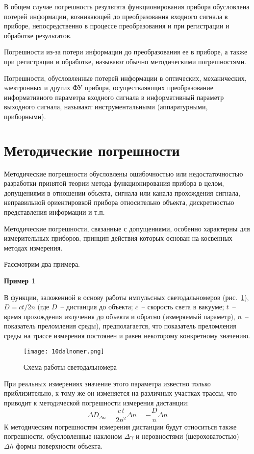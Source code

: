 В общем случае погрешность результата функционирования прибора обусловлена потерей информации, возникающей до преобразования входного сигнала в приборе, непосредственно в процессе преобразования и при регистрации и обработке результатов. 

Погрешности из-за потери информации до преобразования ее в приборе, а также при регистрации и обработке, называют обычно методическими погрешностями.

Погрешности, обусловленные потерей информации в оптических, механических, электронных и других ФУ прибора, осуществляющих преобразование информативного параметра входного сигнала в информативный параметр выходного сигнала, называют инструментальными (аппаратурными, приборными).

\section{Методические погрешности}

Методические погрешности обусловлены ошибочностью или недостаточностью разработки принятой теории метода функционирования прибора в целом, допущениями в отношении объекта, сигнала или канала прохождения сигнала, неправильной ориентировкой прибора относительно объекта, дискретностью представления информации и т.п.

Методические погрешности, связанные с допущениями, особенно характерны для измерительных приборов, принцип действия которых основан на косвенных методах измерения.

Рассмотрим два примера.

\begin{flushleft}
\textbf{Пример 1}
\end{flushleft}

В функции, заложенной в основу работы импульсных светодальномеров (рис.~\ref{pic:10dalnomer}), $ D = ct/2n $ (где $ D $~-- дистанция до объекта; $ c $~-- скорость света в вакууме; $ t $~-- время прохождения излучения до объекта и обратно (измеряемый параметр), $ n $~-- показатель преломления среды), предполагается, что показатель преломления среды на трассе измерения постоянен и равен некоторому конкретному значению.

\begin{figure}[h!]
	\caption{ Схема работы светодальномера }
	\texttt{[image: 10dalnomer.png]}
	\label{pic:10dalnomer}
\end{figure}

При реальных измерениях значение этого параметра известно только приблизительно, к тому же он изменяется на различных участках трассы, что приводит к методической погрешности измерения дистанции:
\[ \Delta D_{\Delta n} = \dfrac{c\,t}{2n^2}\Delta n = - \dfrac{D}{n}\Delta n \]
К методическим погрешностям измерения дистанции будут относиться также погрешности, обусловленные наклоном $ \Delta\gamma $ и неровностями (шероховатостью) $ \Delta h $ формы поверхности объекта.

